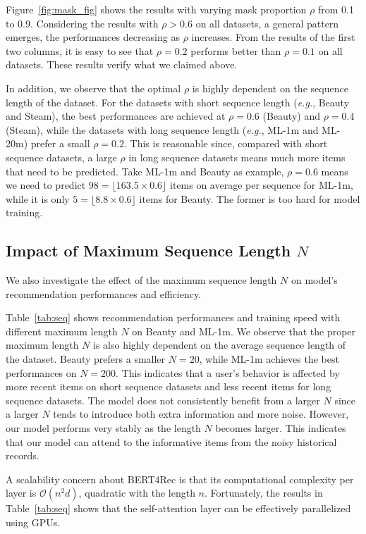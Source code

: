 Figure~\ref{fig:mask_fig} shows the results with varying mask proportion $\rho$ from 0.1 to 0.9. Considering the results with $\rho > 0.6$ on all datasets, a general pattern emerges, the performances decreasing as $\rho$ increases. From the results of the first two columns, it is easy to see that $\rho=0.2$ performs better than $\rho=0.1$ on all datasets. These results verify what we claimed above.

In addition, we observe that the optimal $\rho$ is highly dependent on the sequence length of the dataset. For the datasets with short sequence length (\textit{e.g.}, Beauty and Steam), the best performances are achieved at $\rho{=}0.6$ (Beauty) and $\rho{=}0.4$ (Steam), while the datasets with long sequence length (\textit{e.g.}, ML-1m and ML-20m) prefer a small $\rho{=}0.2$.
This is reasonable since, compared with short sequence datasets, a large $\rho$ in long sequence datasets means much more items that need to be predicted. Take ML-1m and Beauty as example, $\rho{=}0.6$ means we need to predict $98 {=} \lfloor 163.5{\times} 0.6 \rfloor $ items on average per sequence for ML-1m, while it is only $5 {=} \lfloor 8.8{\times} 0.6 \rfloor$ items for Beauty. The former is too hard for model training.

\subsection{Impact of Maximum Sequence Length $N$}

We also investigate the effect of the maximum sequence length $N$ on model's recommendation performances and efficiency.

Table~\ref{tab:seq} shows recommendation performances and training speed with different maximum length $N$ on Beauty and ML-1m. We observe that the proper maximum length $N$ is also highly dependent on the average sequence length of the dataset. Beauty prefers a smaller $N=20$, while ML-1m achieves the best performances on $N=200$. This indicates that a user's behavior is affected by more recent items on short sequence datasets and less recent items for long sequence datasets. The model does not consistently benefit from a larger $N$ since a larger $N$ tends to introduce both extra information and more noise. However, our model performs very stably as the length $N$ becomes larger. This indicates that our model can attend to the informative items from the noisy historical records.

A scalability concern about BERT4Rec is that its computational complexity per layer is $\mathcal{O}(n^2d)$, quadratic with the length $n$. Fortunately, the results in Table~\ref{tab:seq} shows that the self-attention layer can be effectively parallelized using GPUs.


